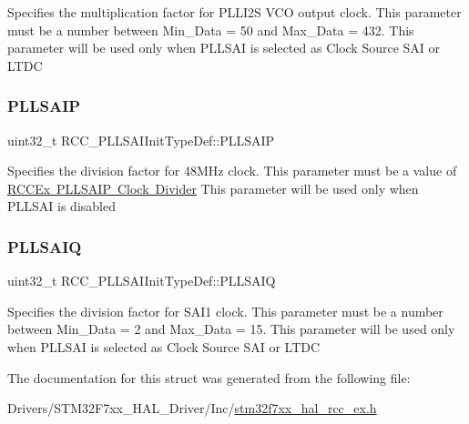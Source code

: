 Specifies the multiplication factor for P\+L\+L\+I2S V\+CO output clock. This parameter must be a number between Min\+\_\+\+Data = 50 and Max\+\_\+\+Data = 432. This parameter will be used only when P\+L\+L\+S\+AI is selected as Clock Source S\+AI or L\+T\+DC \mbox{\label{struct_r_c_c___p_l_l_s_a_i_init_type_def_a8cfa7d387fc9b118e9066a63d2b845bf}} 
\subsubsection{\texorpdfstring{PLLSAIP}{PLLSAIP}}
{\footnotesize\ttfamily uint32\+\_\+t R\+C\+C\+\_\+\+P\+L\+L\+S\+A\+I\+Init\+Type\+Def\+::\+P\+L\+L\+S\+A\+IP}

Specifies the division factor for 48M\+Hz clock. This parameter must be a value of \mbox{\hyperlink{group___r_c_c_ex___p_l_l_s_a_i_p___clock___divider}{R\+C\+C\+Ex P\+L\+L\+S\+A\+IP Clock Divider}} This parameter will be used only when P\+L\+L\+S\+AI is disabled \mbox{\label{struct_r_c_c___p_l_l_s_a_i_init_type_def_addd252bc81b5eb646803cf3e0941499c}} 
\subsubsection{\texorpdfstring{PLLSAIQ}{PLLSAIQ}}
{\footnotesize\ttfamily uint32\+\_\+t R\+C\+C\+\_\+\+P\+L\+L\+S\+A\+I\+Init\+Type\+Def\+::\+P\+L\+L\+S\+A\+IQ}

Specifies the division factor for S\+A\+I1 clock. This parameter must be a number between Min\+\_\+\+Data = 2 and Max\+\_\+\+Data = 15. This parameter will be used only when P\+L\+L\+S\+AI is selected as Clock Source S\+AI or L\+T\+DC 

The documentation for this struct was generated from the following file\+:\begin{DoxyCompactItemize}
\item 
Drivers/\+S\+T\+M32\+F7xx\+\_\+\+H\+A\+L\+\_\+\+Driver/\+Inc/\mbox{\hyperlink{stm32f7xx__hal__rcc__ex_8h}{stm32f7xx\+\_\+hal\+\_\+rcc\+\_\+ex.\+h}}\end{DoxyCompactItemize}
